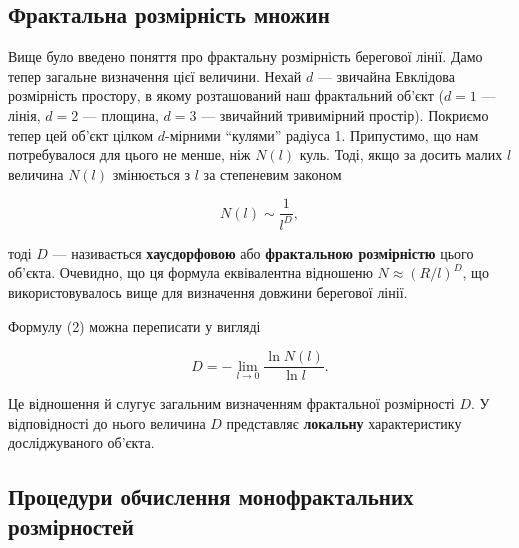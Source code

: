 \documentclass[
  letterpaper,
]{report}
\begin{document}
\hypertarget{ux444ux440ux430ux43aux442ux430ux43bux44cux43dux430-ux440ux43eux437ux43cux456ux440ux43dux456ux441ux442ux44c-ux43cux43dux43eux436ux438ux43d}{%
\subsection{Фрактальна розмірність
множин}\label{ux444ux440ux430ux43aux442ux430ux43bux44cux43dux430-ux440ux43eux437ux43cux456ux440ux43dux456ux441ux442ux44c-ux43cux43dux43eux436ux438ux43d}}

Вище було введено поняття про фрактальну розмірність берегової лінії.
Дамо тепер загальне визначення цієї величини. Нехай \(d\) --- звичайна
Евклідова розмірність простору, в якому розташований наш фрактальний
об'єкт (\(d=1\) --- лінія, \(d=2\) --- площина, \(d=3\) --- звичайний
тривимірний простір). Покриємо тепер цей об'єкт цілком \(d\)-мірними
``кулями'' радіуса 1. Припустимо, що нам потребувалося для цього не
менше, ніж \(N(l)\) куль. Тоді, якщо за досить малих \(l\) величина
\(N(l)\) змінюється з \(l\) за степеневим законом

\[
N(l) \sim \frac{1}{l^D}, \tag{2}
\]

тоді \(D\) --- називається \textbf{хаусдорфовою} або \textbf{фрактальною
розмірністю} цього об'єкта. Очевидно, що ця формула еквівалентна
відношеню \(N \approx \left( R/l \right)^{D}\), що використовувалось
вище для визначення довжини берегової лінії.

Формулу (2) можна переписати у вигляді

\[
D = -\lim_{l \to 0} \frac{\ln{N(l)}}{\ln{l}}. \tag{3}
\]

Це відношення й слугує загальним визначенням фрактальної розмірності
\(D\). У відповідності до нього величина \(D\) представляє
\textbf{локальну} характеристику досліджуваного об'єкта.

\hypertarget{ux43fux440ux43eux446ux435ux434ux443ux440ux438-ux43eux431ux447ux438ux441ux43bux435ux43dux43dux44f-ux43cux43eux43dux43eux444ux440ux430ux43aux442ux430ux43bux44cux43dux438ux445-ux440ux43eux437ux43cux456ux440ux43dux43eux441ux442ux435ux439}{%
\subsection{Процедури обчислення монофрактальних
розмірностей}\label{ux43fux440ux43eux446ux435ux434ux443ux440ux438-ux43eux431ux447ux438ux441ux43bux435ux43dux43dux44f-ux43cux43eux43dux43eux444ux440ux430ux43aux442ux430ux43bux44cux43dux438ux445-ux440ux43eux437ux43cux456ux440ux43dux43eux441ux442ux435ux439}}
\end{document}
